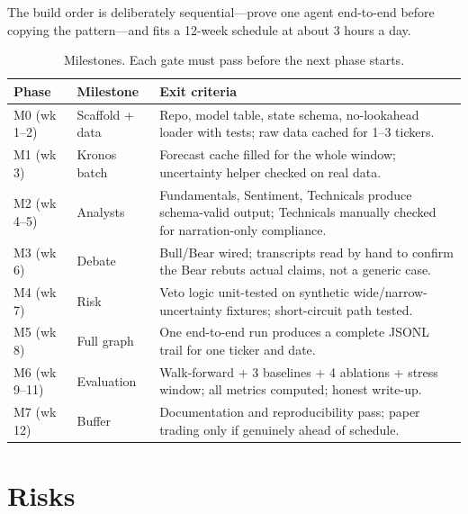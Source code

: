 \documentclass[conference]{IEEEtran}
\begin{document}
The build order is deliberately sequential---prove one agent end-to-end before copying the pattern---and fits a 12-week schedule at about 3 hours a day.

\begin{table}[!t]
\centering
\caption{Milestones. Each gate must pass before the next phase starts.}
\label{tab:milestones}
\small
\begin{tabularx}{\columnwidth}{L{0.8cm} L{2.2cm} X}
\toprule
\textbf{Phase} & \textbf{Milestone} & \textbf{Exit criteria} \\
\midrule
M0 (wk 1--2) & Scaffold + data & Repo, model table, state schema, no-lookahead loader with tests; raw data cached for 1--3 tickers. \\
\addlinespace[2pt]
M1 (wk 3) & Kronos batch & Forecast cache filled for the whole window; uncertainty helper checked on real data. \\
\addlinespace[2pt]
M2 (wk 4--5) & Analysts & Fundamentals, Sentiment, Technicals produce schema-valid output; Technicals manually checked for narration-only compliance. \\
\addlinespace[2pt]
M3 (wk 6) & Debate & Bull/Bear wired; transcripts read by hand to confirm the Bear rebuts actual claims, not a generic case. \\
\addlinespace[2pt]
M4 (wk 7) & Risk & Veto logic unit-tested on synthetic wide/narrow-uncertainty fixtures; short-circuit path tested. \\
\addlinespace[2pt]
M5 (wk 8) & Full graph & One end-to-end run produces a complete JSONL trail for one ticker and date. \\
\addlinespace[2pt]
M6 (wk 9--11) & Evaluation & Walk-forward + 3 baselines + 4 ablations + stress window; all metrics computed; honest write-up. \\
\addlinespace[2pt]
M7 (wk 12) & Buffer & Documentation and reproducibility pass; paper trading only if genuinely ahead of schedule. \\
\bottomrule
\end{tabularx}
\end{table}

\section{Risks}
\end{document}
